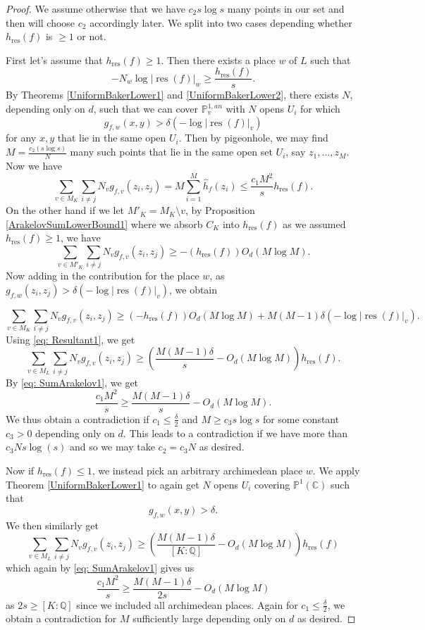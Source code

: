 \documentclass[10pt]{amsart}
\newcommand{\bb}{\mathbb}
\newcommand{\res}{\operatorname{res}}
\newcommand{\berkP}{\mathbb{P}^{1,an}}
\newcommand{\h}{\widehat{h}}
\numberwithin{theorem}{section}
\numberwithin{example}{section}
\numberwithin{definition}{section}
\begin{document}
\begin{proof}
We assume otherwise that we have $c_2 s \log s$ many points in our set and then will choose $c_2$ accordingly later. We split into two cases depending whether $h_{\res}(f)$ is $\geq 1$ or not. 
\par 
First let's assume that $h_{\res}(f) \geq 1$. Then there exists a place $w$ of $L$ such that 
\begin{equation} \label{eq: Resultant1}
-N_w \log |\res(f)|_w \geq \frac{h_{\res}(f)}{s}.
\end{equation}
By Theorems \ref{UniformBakerLower1} and \ref{UniformBakerLower2}, there exists $N$, depending only on $d$, such that we can cover $\berkP_v$ with $N$ opens $U_i$ for which 
$$g_{f,w}(x,y) > \delta (-\log |\res(f)|_v)$$
for any $x,y$ that lie in the same open $U_i$. Then by pigeonhole, we may find $M = \frac{c_2 (s \log s)}{N}$ many such points that lie in the same open set $U_i$, say $z_1,\ldots,z_M$. Now we have 
\begin{equation} \label{eq: SumArakelov1}
\sum_{v \in M_K} \sum_{i \not = j} N_v g_{f,v}(z_i,z_j) = M \sum_{i=1}^{M} \h_f(z_i) \leq \frac{c_1 M^2}{s} h_{\res}(f).
\end{equation}
On the other hand if we let $M'_K = M_K \setminus v$, by Proposition \ref{ArakelovSumLowerBound1} where we absorb $C_K$ into $h_{\res}(f)$ as we assumed $h_{\res}(f) \geq 1$, we have 
$$\sum_{v \in M'_K} \sum_{i \not = j} N_v g_{f,v}(z_i,z_j) \geq -(h_{\res}(f)) O_d(M \log M).$$
Now adding in the contribution for the place $w$, as $g_{f,w}(z_i,z_j) > \delta (-\log |\res(f)|_v)$, we obtain 

$$\sum_{v \in M_K} \sum_{i \not = j} N_v g_{f,v}(z_i,z_j) \geq (-h_{\res}(f)) O_d(M \log M) + M(M-1) \delta (-\log |\res(f)|_v).$$
Using \eqref{eq: Resultant1}, we get 
$$\sum_{v \in M_L} \sum_{i \not = j} N_v g_{f,v}(z_i,z_j) \geq \left( \frac{M(M-1) \delta}{s} - O_d(M \log M) \right) h_{\res}(f).$$
By \eqref{eq: SumArakelov1}, we get
$$\frac{c_1 M^2}{s} \geq \frac{M(M-1) \delta }{s} - O_d(M \log M).$$
We thus obtain a contradiction if $c_1 \leq \frac{\delta}{2}$ and $M \geq c_3 s \log s$ for some constant $c_3 > 0$ depending only on $d$. This leads to a contradiction if we have more than $c_3 N s \log (s)$ and so we may take $c_2 = c_3 N$ as desired.
\par 
Now if $h_{\res}(f) \leq 1$, we instead pick an arbitrary archimedean place $w$. We apply Theorem \ref{UniformBakerLower1} to again get $N$ opens $U_i$ covering $\bb{P}^1(\bb{C})$ such that 
$$g_{f,w}(x,y) > \delta.$$
We then similarly get 
$$\sum_{v \in M_L} \sum_{i \not = j} N_v g_{f,v}(z_i,z_j) \geq \left( \frac{M(M-1) \delta}{[K:\bb{Q}]} - O_d(M \log M) \right) h_{\res}(f)$$
which again by \eqref{eq: SumArakelov1} gives us
$$\frac{c_1 M^2}{s} \geq \frac{M(M-1)\delta}{2s}  - O_d(M \log M)$$
as $2s \geq [K:\bb{Q}]$ since we included all archimedean places. Again for $c_1 \leq \frac{\delta}{2}$, we obtain a contradiction for $M$ sufficiently large depending only on $d$ as desired. 

\end{proof}
\end{document}
